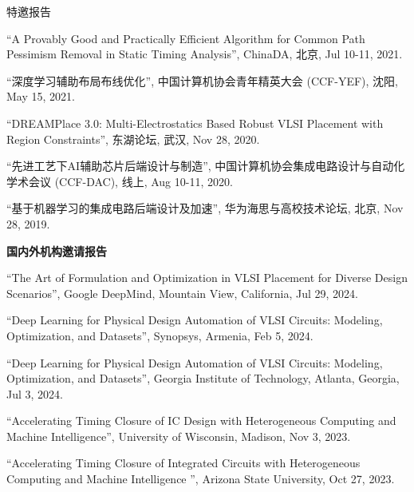 \begin{rSection}{特邀报告}
\begin{description}[font=\normalfont]
\item[{[T5]}]{
``A Provably Good and Practically Efficient Algorithm for Common Path Pessimism Removal in Static Timing Analysis'', ChinaDA, 北京, Jul 10-11, 2021. 
}

\item[{[T4]}]{
``深度学习辅助布局布线优化'', 中国计算机协会青年精英大会 (CCF-YEF), 沈阳, May 15, 2021. 
}

\item[{[T3]}]{
``DREAMPlace 3.0: Multi-Electrostatics Based Robust VLSI Placement with Region Constraints'', 东湖论坛, 武汉, Nov 28, 2020.
}

\item[{[T2]}]{
``先进工艺下AI辅助芯片后端设计与制造'', 中国计算机协会集成电路设计与自动化学术会议 (CCF-DAC), 线上, Aug 10-11, 2020. 
}

\item[{[T1]}]{
``基于机器学习的集成电路后端设计及加速'', 华为海思与高校技术论坛, 北京, Nov 28, 2019. 
}

\end{description}

\textbf{国内外机构邀请报告}
        
\begin{description}[font=\normalfont]

\item[{[T11]}]{
``The Art of Formulation and Optimization in VLSI Placement for Diverse Design Scenarios'', Google DeepMind, Mountain View, California, Jul 29, 2024. 
}

\item[{[T10]}]{
``Deep Learning for Physical Design Automation of VLSI Circuits: Modeling, Optimization, and Datasets'', Synopsys, Armenia, Feb 5, 2024. 
}

\item[{[T9]}]{
``Deep Learning for Physical Design Automation of VLSI Circuits: Modeling, Optimization, and Datasets'', Georgia Institute of Technology, Atlanta, Georgia, Jul 3, 2024. 
}

\item[{[T8]}]{
``Accelerating Timing Closure of IC Design with Heterogeneous Computing and Machine Intelligence'', University of Wisconsin, Madison, Nov 3, 2023. 
}

\item[{[T7]}]{
``Accelerating Timing Closure of Integrated Circuits with Heterogeneous Computing and Machine Intelligence '', Arizona State University, Oct 27, 2023. 
}


\end{description}
\end{rSection}

